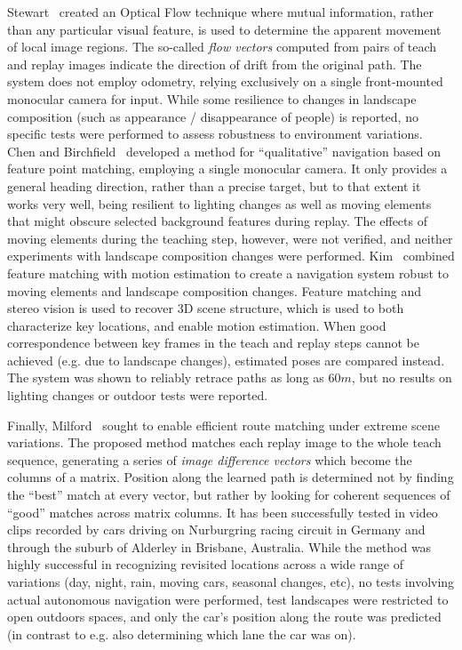 \documentclass[twocolumn, 9pt,fleqn]{jsproceedings}
\begin{document}
Stewart~\cite{STE12} created an Optical Flow technique where mutual information, rather than any particular visual feature, is used to determine the apparent movement of local image regions. The so-called \textit{flow vectors} computed from pairs of teach and replay images indicate the direction of drift from the original path. The system does not employ odometry, relying exclusively on a single front-mounted monocular camera for input. While some resilience to changes in landscape composition (such as appearance / disappearance of people) is reported, no specific tests were performed to assess robustness to environment variations. Chen and Birchfield~\cite{CHE06} developed a method for ``qualitative'' navigation based on feature point matching, employing a single monocular camera. It only provides a general heading direction, rather than a precise target, but to that extent it works very well, being resilient to lighting changes as well as moving elements that might obscure selected background features during replay. The effects of moving elements during the teaching step, however, were not verified, and neither experiments with landscape composition changes were performed. Kim~\cite{KIM08} combined feature matching with motion estimation to create a navigation system robust to moving elements and landscape composition changes. Feature matching and stereo vision is used to recover 3D scene structure, which is used to both characterize key locations, and enable motion estimation. When good correspondence between key frames in the teach and replay steps cannot be achieved (e.g. due to landscape changes), estimated poses are compared instead. The system was shown to reliably retrace paths as long as $60m$, but no results on lighting changes or outdoor tests were reported.

Finally, Milford~\cite{MIL12} sought to enable efficient route matching under extreme scene variations. The proposed method matches each replay image to the whole teach sequence, generating a series of \textit{image difference vectors} which become the columns of a matrix. Position along the learned path is determined not by finding the ``best'' match at every vector, but rather by looking for coherent sequences of ``good'' matches across matrix columns. It has been successfully tested in video clips recorded by cars driving on Nurburgring racing circuit in Germany and through the suburb of Alderley in Brisbane, Australia. While the method was highly successful in recognizing revisited locations across a wide range of variations (day, night, rain, moving cars, seasonal changes, etc), no tests involving actual autonomous navigation were performed, test landscapes were restricted to open outdoors spaces, and only the car's position along the route was predicted (in contrast to e.g. also determining which lane the car was on).
\end{document}
